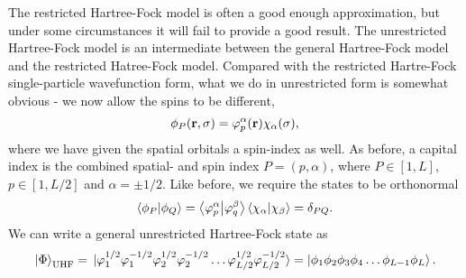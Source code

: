 The restricted Hartree-Fock model is often a good enough approximation, but under some 
circumstances it will fail to provide a good result. The unrestricted Hartree-Fock model 
is an intermediate between the general Hartree-Fock model and the restricted Hatree-Fock 
model. Compared with the restricted Hartre-Fock single-particle wavefunction form, what we do 
in unrestricted form is somewhat obvious - we now allow the spins to be different,
\begin{equation}
    \phi_P(\vb{r}, \sigma) = \varphi_p^{\alpha}(\vb{r})\chi_\alpha(\sigma),
\end{equation}
where we have given the spatial orbitals a spin-index as well. As before, a capital index 
is the combined spatial- and spin index $P=(p,\alpha)$, where $P \in [1,L]$, $p\in [1, L/2]$
and $\alpha = \pm 1/2$. 
Like before, we require the states to be orthonormal 
\begin{equation}
    \braket{\phi_P}{\phi_Q} 
    = \braket{\varphi^\alpha_p}{\varphi^\beta_q}\braket{\chi_\alpha}{\chi_\beta}
    = \delta_{PQ}.
\end{equation}
We can write a general unrestricted Hartree-Fock state as 
\begin{equation}
    \ket{\Phi}_{\text{UHF}}
        =
        \ket*{\varphi_1^{1/2} \varphi_1^{-1/2} \varphi_2^{1/2} \varphi_2^{-1/2}
            \dots \varphi_{L/2}^{1/2} \varphi_{L/2}^{-1/2}}
        =
        \ket{\phi_1\phi_2\phi_3\phi_4 \dots \phi_{L-1} \phi_L}.
\end{equation}

